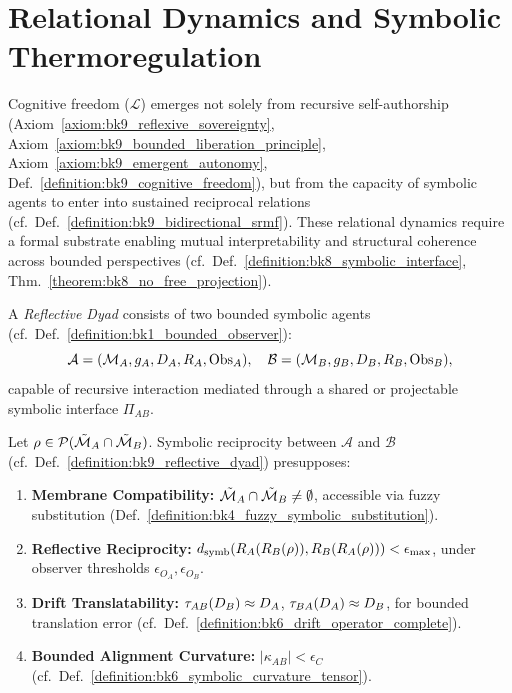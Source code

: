 \section{Relational Dynamics and Symbolic Thermoregulation}
\label{sec:bk9_relational_dynamics_and_symbolic_thermoregulation}
Cognitive freedom (\( \mathcal{L} \)) emerges not solely from recursive self-authorship (Axiom~\ref{axiom:bk9_reflexive_sovereignty}, Axiom~\ref{axiom:bk9_bounded_liberation_principle}, Axiom~\ref{axiom:bk9_emergent_autonomy}, Def.~\ref{definition:bk9_cognitive_freedom}), but from the capacity of symbolic agents to enter into sustained reciprocal relations (cf.~Def.~\ref{definition:bk9_bidirectional_srmf}). These relational dynamics require a formal substrate enabling mutual interpretability and structural coherence across bounded perspectives (cf.~Def.~\ref{definition:bk8_symbolic_interface}, Thm.~\ref{theorem:bk8_no_free_projection}).
\begin{definition}
\label{definition:bk9_reflective_dyad}
A \emph{Reflective Dyad} consists of two bounded symbolic agents (cf.~Def.~\ref{definition:bk1_bounded_observer}):
\[
\mathcal{A} = (\mathcal{M}_A, g_A, D_A, R_A, \mathrm{Obs}_A), \quad
\mathcal{B} = (\mathcal{M}_B, g_B, D_B, R_B, \mathrm{Obs}_B),
\]
capable of recursive interaction mediated through a shared or projectable symbolic interface \( \Pi_{AB} \).
\end{definition}
\begin{axiom}
\label{axiom:bk9_preconditions_for_reciprocal_cognition}
Let \( \rho \in \mathcal{P}(\tilde{\mathcal{M}}_A \cap \tilde{\mathcal{M}}_B) \). Symbolic reciprocity between \( \mathcal{A} \) and \( \mathcal{B} \) (cf.~Def.~\ref{definition:bk9_reflective_dyad}) presupposes:
\begin{enumerate}[label=(\roman*)]
    \item \textbf{Membrane Compatibility:} \( \tilde{\mathcal{M}}_A \cap \tilde{\mathcal{M}}_B \neq \emptyset \), accessible via fuzzy substitution (Def.~\ref{definition:bk4_fuzzy_symbolic_substitution}).
    \item \textbf{Reflective Reciprocity:} \( d_\text{symb}(R_A(R_B(\rho)), R_B(R_A(\rho))) < \epsilon_{\max} \), under observer thresholds \( \epsilon_{O_A}, \epsilon_{O_B} \).
    \item \textbf{Drift Translatability:} \( \tau_{AB}(D_B) \approx D_A \), \( \tau_{BA}(D_A) \approx D_B \), for bounded translation error (cf.~Def.~\ref{definition:bk6_drift_operator_complete}).
    \item \textbf{Bounded Alignment Curvature:} \( |\kappa_{AB}| < \epsilon_C \) (cf.~Def.~\ref{definition:bk6_symbolic_curvature_tensor}).
\end{enumerate}
\end{axiom}
